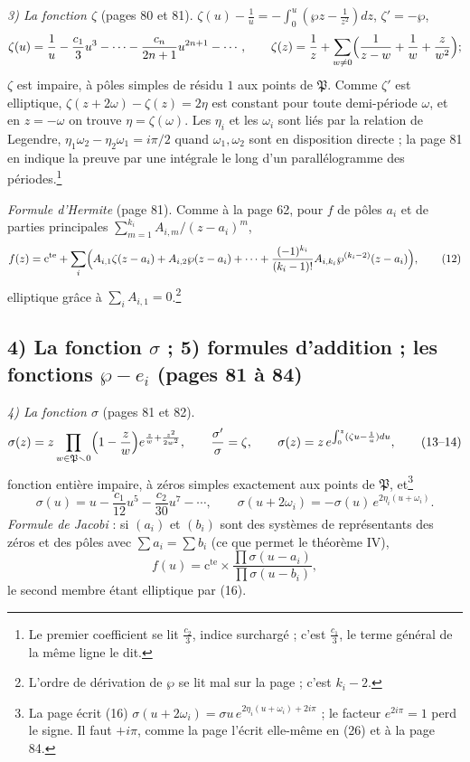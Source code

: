 \documentclass[11pt,a4paper]{article}
\begin{document}
\emph{3) La fonction $\zeta$} (pages 80 et 81). $\zeta(u) - \frac1u = -\int_0^u
(\wp z - \frac{1}{z^2})dz$, $\zeta' = -\wp$,
\[
\zeta(u) = \frac1u - \frac{c_1}{3}u^3 - \cdots - \frac{c_n}{2n+1}u^{2n+1} -
\cdots,
\qquad
\zeta(z) = \frac1z + \sum_{w \neq 0}\Bigl(\frac{1}{z - w} + \frac1w +
\frac{z}{w^2}\Bigr) ;
\]
$\zeta$ est impaire, à pôles simples de résidu $1$ aux points de $\mathfrak{P}$.
Comme $\zeta'$ est elliptique, $\zeta(z + 2\omega) - \zeta(z) = 2\eta$ est
constant pour toute demi-période $\omega$, et en $z = -\omega$ on trouve $\eta
= \zeta(\omega)$. Les $\eta_i$ et les $\omega_i$ sont liés par la relation de
Legendre, $\eta_1\omega_2 - \eta_2\omega_1 = i\pi/2$ quand $\omega_1, \omega_2$
sont en disposition directe ; la page 81 en indique la preuve par une
intégrale le long d'un parallélogramme des périodes.\footnote{Le premier
coefficient se lit $\frac{c_2}{3}$, indice surchargé ; c'est $\frac{c_1}{3}$, le
terme général de la même ligne le dit.}

\emph{Formule d'Hermite} (page 81). Comme à la page 62, pour $f$ de pôles $a_i$
et de parties principales $\sum_{m=1}^{k_i} A_{i,m}/(z - a_i)^m$,
\[
f(z) = \text{c}^{\text{te}} + \sum_i\Bigl(A_{i,1}\zeta(z - a_i) + A_{i,2}\wp(z -
a_i) + \cdots + \frac{(-1)^{k_i}}{(k_i - 1)!}A_{i,k_i}\wp^{(k_i - 2)}(z -
a_i)\Bigr), \tag{12}
\]
elliptique grâce à $\sum_i A_{i,1} = 0$.\footnote{L'ordre de dérivation de
$\wp$ se lit mal sur la page ; c'est $k_i - 2$.}

\subsection*{4) La fonction $\sigma$ ; 5) formules d'addition ; les fonctions $\wp - e_i$ (pages 81 à 84)}

\emph{4) La fonction $\sigma$} (pages 81 et 82).
\[
\sigma(z) = z\prod_{w \in \mathfrak{P}\smallsetminus 0}\Bigl(1 -
\frac{z}{w}\Bigr)e^{\frac{z}{w} + \frac{z^2}{2w^2}}, \qquad
\frac{\sigma'}{\sigma} = \zeta, \qquad \sigma(z) = z\,e^{\int_0^z(\zeta u -
\frac1u)du}, \tag{13--14}
\]
fonction entière impaire, à zéros simples exactement aux points de
$\mathfrak{P}$, et\footnote{La page écrit (16) $\sigma(u + 2\omega_i) = \sigma u\,e^{2\eta_i(u +
\omega_i) + 2i\pi}$ ; le facteur $e^{2i\pi} = 1$ perd le signe. Il faut $+i\pi$,
comme la page l'écrit elle-même en (26) et à la page 84.}
\[
\sigma(u) = u - \frac{c_1}{12}u^5 - \frac{c_2}{30}u^7 - \cdots, \qquad
\sigma(u + 2\omega_i) = -\sigma(u)\,e^{2\eta_i(u + \omega_i)} . \tag{15--16}
\]
\emph{Formule de
Jacobi} : si $(a_i)$ et $(b_i)$ sont des systèmes de représentants des zéros
et des pôles avec $\sum a_i = \sum b_i$ (ce que permet le théorème IV),
\[
f(u) = \text{c}^{\text{te}} \times \frac{\prod\sigma(u - a_i)}{\prod\sigma(u -
b_i)} , \tag{17}
\]
le second membre étant elliptique par (16).
\end{document}
